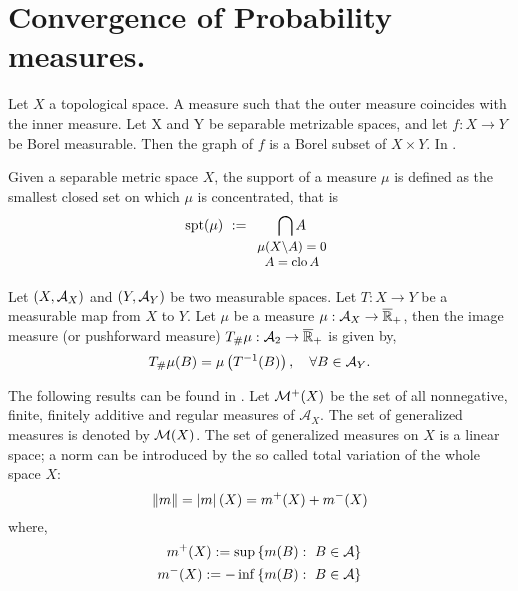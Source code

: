 \section{Convergence of Probability measures.}

Let $X$ a topological space. A measure such that the outer measure coincides with the inner measure. Let X and Y be separable metrizable spaces, and let $f: X \to Y$ be Borel measurable. Then the graph of $f$ is a Borel subset of $X\times Y$. In \cite{Patrick1999ConverProbMeas}.
\begin{definition}
	Given a separable metric space $X$, the support of a measure $\mu$ is defined as the smallest closed set on which $\mu$ is concentrated, that is
	\begin{equation}
	\spt(\mu)\ :=\underset{\small{\begin{array}{c}
			\mu(X\backslash A)=0\\ A=\closu A  \end{array}}}{\bigcap A} 		
	\end{equation} 
\end{definition}
\begin{definition}
	Let $\left( X, \mathcal{A}_X \right)$  and $\left( Y, \mathcal{A}_Y \right)$ be two measurable spaces. Let $T:X\rightarrow Y$ be a measurable map from $X$ to $Y$. Let $\mu$ be a measure $\mu: \mathcal{A}_X\rightarrow \overline{\mathbb{R}}_+$, then the image measure (or pushforward measure) ${T}_{\#} \mu:\mathcal{A}_2\rightarrow \overline{\mathbb{R}}_+$ is given by,
	\begin{equation*}
	{T}_{\#} \mu(B) = \mu\left( T^{-1}(B) \right), \quad \forall B \in \mathcal{A}_Y.
	\end{equation*}
\end{definition}

The following results can be found in \cite{Milan2000TpicsWeakconvProbs}.
Let $\mathcal{M}^+(X)$ be the set of all nonnegative, finite, finitely additive and regular measures of $\mathcal{A}_X$. The set of generalized measures is denoted by $\mathcal{M}(X)$. The set of generalized measures on $X$ is a linear space; a norm can be introduced by the so called total variation of the whole space $X$:
\begin{equation}
	\left\|m\right\|=\left| m \right|(X)=m^+(X)+m^-(X)
\end{equation}
where, 
\begin{align*}
	m^+(X):=\sup\left\lbrace m(B):\ B \in \mathcal{A} \right\rbrace \\
	m^-(X):=-\inf\left\lbrace m(B):\ B \in \mathcal{A} \right\rbrace
\end{align*}

